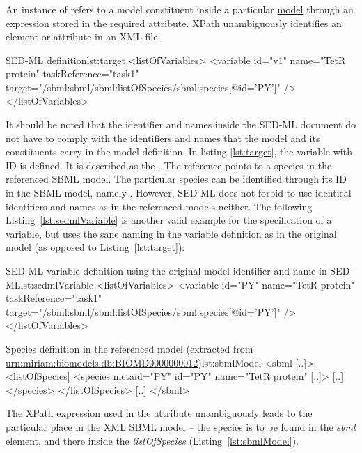 \subsubsection{}
\label{sec:target}
An instance of  refers to a model constituent inside a particular \hyperref[class:model]{model} through an  expression stored in the required  attribute. 
%
XPath  unambiguously identifies an element or attribute in an XML file.

%
\begin{myXmlLst}{SED-ML  definition}{lst:target}
   <listOfVariables>
    <variable id="v1" name="TetR protein" taskReference="task1" 
     target="/sbml:sbml/sbml:listOfSpecies/sbml:species[@id='PY']" />
   </listOfVariables>
\end{myXmlLst}
%
It should be noted that the identifier and names inside the SED-ML document do not have to comply with the identifiers and names that the model and its constituents carry in the model definition. In  listing \vref{lst:target}, the variable with ID  is defined. It is described as the . The reference points to a species in the referenced SBML model. The particular species can be identified through its ID in the SBML model, namely . However, SED-ML does not forbid to use identical identifiers and names as in the referenced models neither. The following Listing~\vref{lst:sedmlVariable} is another valid example for the specification of a variable, but uses the sane naming in the variable definition as in the original model (as opposed to Listing~\ref{lst:target}):
%
\begin{myXmlLst}{SED-ML variable definition using the original model identifier and name in SED-ML}{lst:sedmlVariable}
   <listOfVariables>
    <variable id="PY" name="TetR protein"  taskReference="task1" 
     target="/sbml:sbml/sbml:listOfSpecies/sbml:species[@id='PY']" />
   </listOfVariables>
\end{myXmlLst}
%

%
\begin{myXmlLst}{Species definition in the referenced model (extracted from \url{urn:miriam:biomodels.db:BIOMD0000000012})}{lst:sbmlModel}
<sbml [..]>
 <listOfSpecies]
  <species metaid="PY" id="PY" name="TetR protein" [..]>
   [..]
  </species>
 </listOfSpecies>
 [..]
</sbml>
\end{myXmlLst}
%

The XPath expression used in the  attribute unambiguously leads to the particular place in the XML SBML model -- the species is to be found in the \emph{sbml} element, and there inside the \emph{listOfSpecies} (Listing~\vref{lst:sbmlModel}). 

